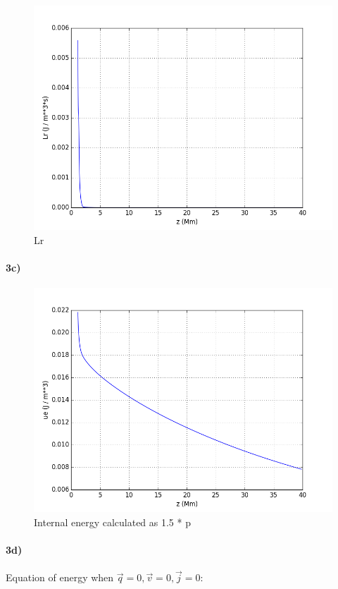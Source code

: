 \documentclass[10pt]{book}
\begin{document}
\begin{figure}[H]
 \centering
 \includegraphics[scale=0.5]{Lr.png}
 \caption{ Lr}
\end{figure}


\paragraph{3c)}

\begin{figure}[H]
 \centering
 \includegraphics[scale=0.5]{ue.png}
 \caption{ Internal energy calculated as 1.5 * p}
\end{figure}

\paragraph{3d)}
Equation of energy when $\vec{q} = 0, \vec{v} = 0, \vec{j} = 0$:
\end{document}
